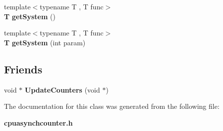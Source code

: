 \begin{DoxyCompactItemize}
\item 
{\footnotesize template$<$typename T , T  func$>$ }\\{\bf T} {\bfseries get\+System} ()\label{classAsynchronCounterState_aa474d444ebe77a8c7e94c904e87879ae}

\item 
{\footnotesize template$<$typename T , T  func$>$ }\\{\bf T} {\bfseries get\+System} (int param)\label{classAsynchronCounterState_a689f439c1e0f3b68401a0dd4341b46f0}

\end{DoxyCompactItemize}
\subsection*{Friends}
\begin{DoxyCompactItemize}
\item 
void $\ast$ {\bfseries Update\+Counters} (void $\ast$)\label{classAsynchronCounterState_a972a576e955b250f38283c8c165a6c7a}

\end{DoxyCompactItemize}


The documentation for this class was generated from the following file\+:\begin{DoxyCompactItemize}
\item 
{\bf cpuasynchcounter.\+h}\end{DoxyCompactItemize}
